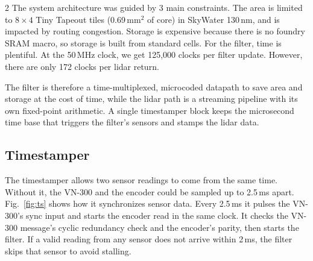 \documentclass[10pt,letterpaper]{article}
\begin{document}
\begin{multicols}{2}
  The system architecture was guided by 3 main constraints.
  The area is limited to $8\times4$ Tiny Tapeout tiles (0.69\,mm$^2$ of core) in SkyWater 130\,nm, and is impacted by routing congestion.
  Storage is expensive because there is no foundry SRAM macro, so storage is built from standard cells.
  For the filter, time is plentiful. At the 50\,MHz clock, we get 125,000 clocks per filter update. However, there are only 172 clocks per lidar return.

  The filter is therefore a time-multiplexed, microcoded datapath to save area and storage at the cost of time, while the lidar path is a streaming pipeline with its own fixed-point arithmetic. A single timestamper block keeps the microsecond time base that triggers the filter's sensors and stamps the lidar data.

  \subsection{Timestamper}

  The timestamper allows two sensor readings to come from the same time. Without it, the VN-300 and the encoder could be sampled up to 2.5\,ms apart.
  Fig.~\ref{fig:ts} shows how it synchronizes sensor data.
  Every 2.5\,ms it pulses the VN-300's sync input and starts the encoder read in the same clock.
  It checks the VN-300 message's cyclic redundancy check and the encoder's parity, then starts the filter.
  If a valid reading from any sensor does not arrive within 2\,ms, the filter skips that sensor to avoid stalling.


\end{multicols}
\end{document}
